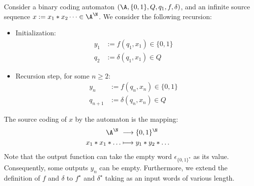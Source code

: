 \documentclass[toc, titlepaged]{../cs-classes/cs-classes}
\begin{document}
\begin{definition}
    Consider a binary coding automaton $(\A, \{0, 1\}, Q, q_1, f, \delta)$, and an infinite source sequence $x:=x_1*x_2\dots\in\A^\N$.
    We consider the following recursion:
    \begin{itemize}
        \item Initialization:
        \begin{equation*}
            \begin{aligned}
                y_1 &:= f(q_1, x_1) \in \{0, 1\}\\
                q_2 &:= \delta(q_1, x_1) \in Q
            \end{aligned}
        \end{equation*}
        \item Recursion step, for some $n\geq2$:
        \begin{equation*}
            \begin{aligned}
                y_n &:= f(q_n, x_n) \in \{0, 1\}\\
                q_{n+1} &:= \delta(q_n, x_n) \in Q
            \end{aligned}
        \end{equation*}
    \end{itemize}
    The source coding of $x$ by the automaton is the mapping:
    \begin{equation*}
        \begin{aligned}
            \A^\N &\longrightarrow \{0, 1\}^\N\\
            x_1*x_1*\dots &\longmapsto y_1*y_2*\dots
        \end{aligned}
    \end{equation*}
    Note that the output function can take the empty word $\epsilon_{\{0, 1\}^\star}$ as its value. Consequently, some outputs $y_n$ can be empty. Furthermore, we extend the definition of $f$ and $\delta$ to $f^\star$ and $\delta^\star$ taking as an input words of various length.
\end{definition}
\end{document}
